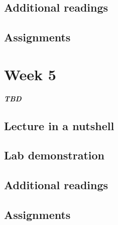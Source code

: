 \documentclass[
]{book}
\begin{document}
\hypertarget{additional-readings-3}{%
\section*{Additional readings}\label{additional-readings-3}}

\hypertarget{assignments-3}{%
\section*{Assignments}\label{assignments-3}}

\hypertarget{week-5}{%
\chapter*{Week 5}\label{week-5}}

\textbf{\emph{TBD}}

\hypertarget{lecture-in-a-nutshell-4}{%
\section*{Lecture in a nutshell}\label{lecture-in-a-nutshell-4}}

\hypertarget{lab-demonstration-4}{%
\section*{Lab demonstration}\label{lab-demonstration-4}}

\hypertarget{additional-readings-4}{%
\section*{Additional readings}\label{additional-readings-4}}

\hypertarget{assignments-4}{%
\section*{Assignments}\label{assignments-4}}

  
\end{document}

